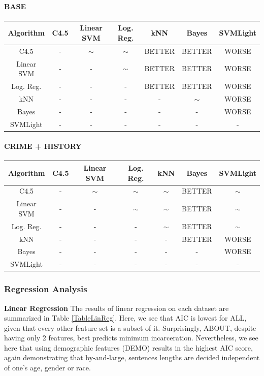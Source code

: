 \documentclass[11pt,letter]{article}
\begin{document}
\paragraph{BASE} \quad

\begin{tabular}{|c|c|c|c|c|c|c|}
\hline
Algorithm & C4.5  & Linear SVM & Log. Reg.  & kNN  & Bayes & SVMLight \\
\hline
C4.5 	& -		& $\sim$	& $\sim$	& BETTER	& BETTER	& WORSE		\\
Linear SVM		& -		& -			& $\sim$	& BETTER	& BETTER	& WORSE		\\
Log. Reg. 	& -		& -			& -			& BETTER	& BETTER	& WORSE 	\\
kNN 		& -		& -			& -			& -			& $\sim$	& WORSE		\\
Bayes			& -		& -			& -			& -			& -			& WORSE		\\
SVMLight & - & - & - & - & - & - \\
\hline
\end{tabular}

\paragraph{CRIME + HISTORY} \quad

\begin{tabular}{|c|c|c|c|c|c|c|}
\hline
Algorithm & C4.5  & Linear SVM & Log. Reg.  & kNN  & Bayes & SVMLight \\
\hline
C4.5 	& -		& $\sim$	& $\sim$	& $\sim$	& BETTER	& $\sim$		\\
Linear SVM		& -		& -			& $\sim$	& $\sim$	& BETTER	& $\sim$		\\
Log. Reg. 	& -		& -			& -			& $\sim$	& BETTER	& $\sim$ 	\\
kNN 		& -		& -			& -			& -			& BETTER	& WORSE		\\
Bayes			& -		& -			& -			& -			& -			& WORSE		\\
SVMLight & - & - & - & - & - & - \\
\hline
\end{tabular}


\subsubsection{Regression Analysis}

\textbf{Linear Regression}
The results of linear regression on each dataset are summarized in Table \ref{TableLinReg}. Here, we see that AIC is lowest for ALL, given that every other feature set is a subset of it. Surprisingly, ABOUT, despite having only 2 features, best predicts minimum incarceration. Nevertheless, we see here that using demographic features (DEMO) results in the highest AIC score, again demonstrating that by-and-large, sentences lengths are decided independent of one's age, gender or race.
\end{document}
